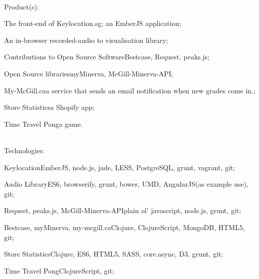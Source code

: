 \documentclass[letterpaper]{deedy-resume} %
\begin{document}
\\[\fpeval{\baseheight}]

Product(s):
\begin{tightitemize}
    \item The front-end of Keylocation.sg; an EmberJS application;
    \item An in-browser recorded-audio to visualisation library;
    \item Contributions to Open Source Software\textemdash Bestcase, Request, peaks.js;
    \item Open Source libraries\textemdash myMinerva, McGill-Minerva-API;
    \item My-McGill.ca\textemdash a service that sends an email notification when new grades come in.;
    \item Store Statistics\textemdash a Shopify app;
    \item Time Travel Pong\textemdash a game.
\end{tightitemize}

\\[\fpeval{\baseheight}]

Technologies: \\
\begin{tightitemize}
    \item Keylocation\textemdash EmberJS, node.js, jade, LESS, PostgreSQL, grunt, vagrant, git;
    \item Audio Library\textemdash ES6, browserify, grunt, bower, UMD, AngularJS(as example use), git;
    \item Request, peaks.js, McGill-Minerva-API\textemdash plain ol' javascript, node.js, grunt, git;
    \item Bestcase, myMinerva, my-mcgill.ca\textemdash Clojure, ClojureScript, MongoDB, HTML5, git;
    \item Store Statistics\textemdash Clojure, ES6, HTML5, SASS, core.async, D3, grunt, git;
    \item Time Travel Pong\textemdash ClojureScript, git;
\end{tightitemize}


\sectionspace %

\newpage %

\end{document}
